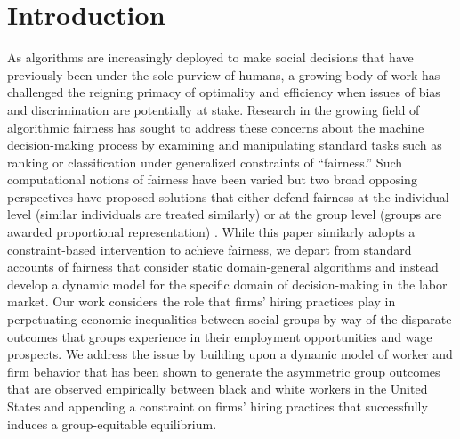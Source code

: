 \documentclass[sigconf]{acmart}
\theoremstyle{definition}
\begin{document}
\section{Introduction}
As algorithms are increasingly deployed to make social decisions that have previously been under the sole purview of humans, a growing body of work has challenged the reigning primacy of optimality and efficiency when issues of bias and discrimination are potentially at stake. Research in the growing field of algorithmic fairness has sought to address these concerns about the machine decision-making process by examining and manipulating standard tasks such as ranking or classification under generalized constraints of ``fairness.'' Such computational notions of fairness have been varied but two broad opposing perspectives have proposed solutions that either defend fairness at the individual level (similar individuals are treated similarly) \citep{dwork2012fairness} or at the group level (groups are awarded proportional representation) \citep{kamishima2011fairness, feldman2015certifying}. While this paper similarly adopts a constraint-based intervention to achieve fairness, we depart from standard accounts of fairness that consider static domain-general algorithms and instead develop a dynamic model for the specific domain of decision-making in the labor market. Our work considers the role that firms' hiring practices play in perpetuating economic inequalities between social groups by way of the disparate outcomes that groups experience in their employment opportunities and wage prospects. We address the issue by building upon a dynamic model of worker and firm behavior that has been shown to generate the asymmetric group outcomes that are observed empirically between black and white workers in the United States \cite{cain1986economic, altonji1999race, fryer2013racial} and appending a constraint on firms' hiring practices that successfully induces a group-equitable equilibrium.



\end{document}
